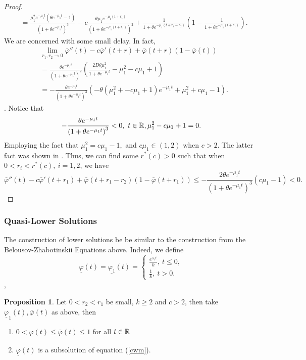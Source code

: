 \documentclass[12pt,letterpaper]{amsart}
\theoremstyle{definition}
\newtheorem{proposition}[theorem]{Proposition}
\theoremstyle{remark}
\numberwithin{equation}{section}
\begin{document}
\begin{proof}
\begin{align*}
  &= \frac{\mu_1^2 e^{-\mu_1 t}\left(\theta e^{-\mu_1 t}-1\right)}{\left(1+\theta e^{-\mu_1 t}\right)^3}-c \frac{\theta \mu_1e^{-\mu_1 (t+r_1)}}{\left(1+\theta e^{-\mu_1 (t+r_1)}\right)^2}+\frac{1}{1+\theta e^{-\mu_1 (t+r_1-r_2)}}\left(1-\frac{1}{1+\theta e^{-\mu_1 (t+r_1)}}\right).
 \end{align*}
  We are concerned with some small delay. In fact, 
  \begin{align*}
 &\lim_{r_1,r_2\to 0} \bar{\varphi}''(t)-c\bar{\varphi}'(t+r)+\bar{\varphi}(t+r)\left(1-\bar{\varphi}(t)\right)\\
 &=\frac{\theta e^{-\mu_1 t}}{\left(1+\theta e^{-\mu_1 t}\right)^2}\left(\frac{2D\theta \mu_1^2}{1+\theta e^{-\mu_1 t}}-\mu_1^2-c\mu_1+1\right)\\
 &=-\frac{\theta e^{-\mu_1 t}}{\left(1+\theta e^{-\mu_1 t}\right)^3}\left(-\theta\left(\mu_1^2+-c\mu_1+1\right)e^{-\mu_1 t}+ \mu_1^2 +c\mu_1-1\right).
\end{align*}. 
Notice that 
\[-\frac{\theta e^{-\mu_1 t}}{\left(1+\theta e^{-\mu_1 t}\right)^3}<0, \ t\in \mathbb R, \mu_1^2-c\mu_1+1=0.\]
Employing the fact that $\mu_1^2=c\mu_1-1,$ and $c\mu_1\in (1,2)$ when $c>2.$ The latter fact was shown in \cite{wuzou}. Thus, we can find some $r^*(c)>0$ such that when $0<r_i<r^*(c), \ i=1,2$, we have
\[\bar{\varphi}''(t)-c\bar{\varphi}'(t+r_1)+\bar{\varphi}(t+r_1-r_2)\left(1-\bar{\varphi}(t+r_1)\right)\leq-\frac{2\theta e^{-\mu_1 t}}{\left(1+\theta e^{-\mu_1 t}\right)^3}\left(c\mu_1-1\right)<0.\]
\end{proof} 

\subsubsection{Quasi-Lower Solutions}
The construction of lower solutions be be similar to the construction from the Belousov-Zhabotinskii Equations above. Indeed, we define 
$$\underline{\varphi}(t)=
\underline{ \varphi_1}(t)=\begin{cases} \frac{ e^{\lambda_1 t}}{k}, \ t\le 0 ,\\
\frac{1}{k} , \ t> 0.
\end{cases}
$$, 
\begin{proposition}
Let $0<r_2<r_1$ be small, $k\ge2$ and $c>2$, then take $\underline{\varphi}_1(t), \bar{\varphi}(t)$  as above, then  
\begin{enumerate}
\item $0<\underline{\varphi}(t)\leq \bar{\varphi}(t) \le 1$ for all $t\in \mathbb R$
\item $\underline{\varphi}(t)$ is a subsolution of equation (\ref{cwm}).
\end{enumerate}
\end{proposition}
\end{document}
